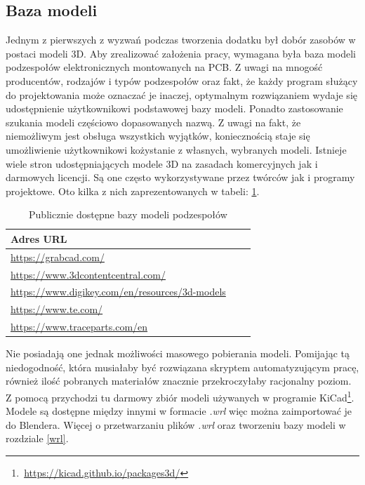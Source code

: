 \documentclass{xmgr}
\begin{document}
\subsection{Baza modeli}

Jednym z pierwszych z wyzwań podczas tworzenia dodatku był dobór zasobów w postaci modeli 3D. Aby zrealizować założenia pracy, wymagana była baza modeli podzespołów elektronicznych montowanych na PCB. Z uwagi na mnogość producentów, rodzajów i typów podzespołów oraz fakt, że każdy program służący do projektowania może oznaczać je inaczej, optymalnym rozwiązaniem wydaje się udostępnienie użytkownikowi podstawowej bazy modeli. Ponadto zastosowanie szukania modeli częściowo dopasowanych nazwą. Z uwagi na fakt, że niemożliwym jest obsługa wszystkich wyjątków, koniecznością staje się umożliwienie użytkownikowi kożystanie z własnych, wybranych modeli. Istnieje wiele stron udostępniających modele 3D na zasadach komercyjnych jak i darmowych licencji. Są one często wykorzystywane przez twórców jak i programy projektowe. Oto kilka z nich zaprezentowanych w tabeli: \ref{fig:table}.

\begin{table}[htb]
\begin{tabular}{|l|l|l|} \hline
Adres URL \\ \hline
\url{https://grabcad.com/} \\ \hline
\url{https://www.3dcontentcentral.com/} \\ \hline
\url{https://www.digikey.com/en/resources/3d-models} \\ \hline
\url{https://www.te.com/} \\ \hline
\url{https://www.traceparts.com/en} \\ \hline
\end{tabular}
\caption{Publicznie dostępne bazy modeli podzespołów}
\label{fig:table}
\end{table}
Nie posiadają one jednak możliwości masowego pobierania modeli. Pomijając tą niedogodność, która musiałaby być rozwiązana skryptem automatyzującym pracę, również ilość pobranych materiałów znacznie przekroczyłaby racjonalny poziom. Z pomocą przychodzi tu darmowy zbiór modeli używanych w programie KiCad\footnote{\,\url{https://kicad.github.io/packages3d/}}. Modele są dostępne między innymi w formacie \emph{.wrl} więc można zaimportować je do Blendera. Więcej o przetwarzaniu plików \emph{.wrl} oraz tworzeniu bazy modeli w rozdziale \ref{wrl}.
\end{document}
